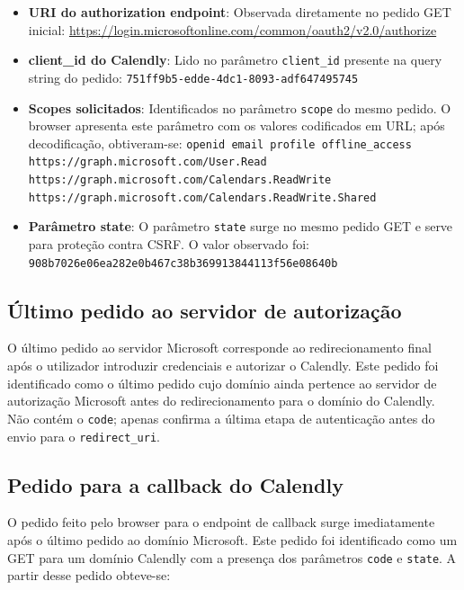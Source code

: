 \begin{itemize}
  \item \textbf{URI do authorization endpoint}:  
  Observada diretamente no pedido GET inicial:  
  \url{https://login.microsoftonline.com/common/oauth2/v2.0/authorize}

  \item \textbf{client\_id do Calendly}:  
  Lido no parâmetro \texttt{client\_id} presente na query string do pedido:  
  \texttt{751ff9b5-edde-4dc1-8093-adf647495745}

  \item \textbf{Scopes solicitados}:  
  Identificados no parâmetro \texttt{scope} do mesmo pedido. O browser apresenta este parâmetro
  com os valores codificados em URL; após decodificação, obtiveram-se:
  \texttt{openid email profile offline\_access \\
  https://graph.microsoft.com/User.Read \\
  https://graph.microsoft.com/Calendars.ReadWrite \\
  https://graph.microsoft.com/Calendars.ReadWrite.Shared}
  
  \item \textbf{Parâmetro state}:  
  O parâmetro \texttt{state} surge no mesmo pedido GET e serve para proteção contra CSRF. O valor observado foi:  
  \texttt{908b7026e06ea282e0b467c38b369913844113f56e08640b}
\end{itemize}

\subsection*{Último pedido ao servidor de autorização}

O último pedido ao servidor Microsoft corresponde ao redirecionamento final após o utilizador introduzir
credenciais e autorizar o Calendly. Este pedido foi identificado como o último pedido cujo domínio ainda
pertence ao servidor de autorização Microsoft antes do redirecionamento para o domínio do Calendly.
Não contém o \texttt{code}; apenas confirma a última etapa de autenticação antes do envio para o
\texttt{redirect\_uri}.

\subsection*{Pedido para a callback do Calendly}

O pedido feito pelo browser para o endpoint de callback surge imediatamente após o último pedido ao
domínio Microsoft. Este pedido foi identificado como um GET para um domínio Calendly com a presença
dos parâmetros \texttt{code} e \texttt{state}.  
A partir desse pedido obteve-se:


